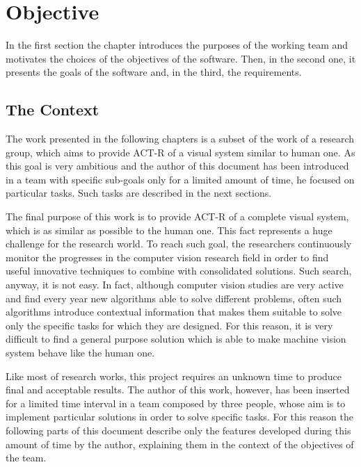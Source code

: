 \chapter{Objective}\label{chObjective}
	In the first section the chapter introduces the purposes of the working team and motivates the choices of the objectives of the software. Then, in the second one, it presents the goals of the software and, in the third, the requirements.
 

	\section{The Context}
	The work presented in the following chapters is a subset of the work of a research group, which aims to provide \mbox{ACT-R} of a visual system similar to human one. As this goal is very ambitious and the author of this document has been introduced in a team with specific sub-goals only for a limited amount of time, he focused on particular tasks. Such tasks are described in the next sections.

	The final purpose of this work is to provide \mbox{ACT-R} of a complete visual system, which is as similar as possible to the human one. This fact represents a huge challenge for the research world. To reach such goal, the researchers continuously monitor the progresses in the computer vision research field in order to find useful innovative techniques to combine with consolidated solutions. 
	Such search, anyway, it is not easy. In fact, although computer vision studies are very active and find every year new algorithms able to solve different problems, often such algorithms introduce contextual information that makes them suitable to solve only the specific tasks for which they are designed. For this reason, it is very difficult to find a general purpose solution which is able to make machine vision system behave like the human one.

	Like most of research works, this project requires an unknown time to produce final and acceptable results.
	The author of this work, however, has been inserted for a limited time interval in a team composed by three people, whose aim is to implement particular solutions in order to solve specific tasks. 
	For this reason the following parts of this document describe only the features developed during this amount of time by the author, explaining them in the context of the objectives of the team. 
	
